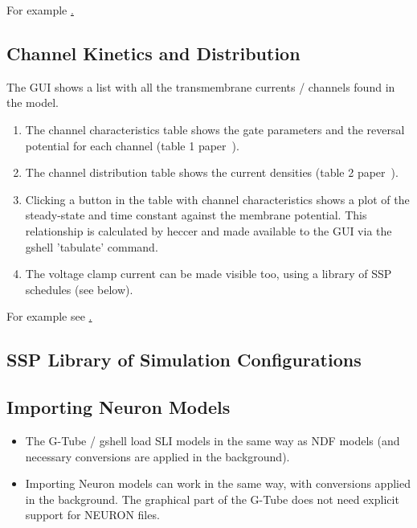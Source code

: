 \documentclass[12pt]{article}
\begin{document}
For example
\href{../pub-purkinje-deschutter-morphology/pub-purkinje-deschutter-morphology.tex}.

\subsection{Channel Kinetics and Distribution}

The GUI shows a list with all the transmembrane currents /
channels found in the model.
\begin{enumerate}
\item The channel characteristics table shows the gate parameters and
  the reversal potential for each channel (table 1
  paper~\cite{deschutter94:_purkin_i}).
\item The channel distribution table shows the current densities
  (table 2 paper~\cite{deschutter94:_purkin_i}).
\item Clicking a button in the table with channel characteristics
  shows a plot of the steady-state and time constant against the
  membrane potential.  This relationship is calculated by heccer and
  made available to the GUI via the gshell 'tabulate' command.
\item The voltage clamp current can be made visible too, using a
  library of SSP schedules (see below).
\end{enumerate}

For example see
\href{../pub-purkinje-deschutter-kinetics/pub-purkinje-deschutter-kinetics.tex}.


\subsection{SSP Library of Simulation Configurations}

\subsection{Importing Neuron Models}

\begin{itemize}
\item The G-Tube / gshell load SLI models in the same way as NDF
  models (and necessary conversions are applied in the background).
\item Importing Neuron models can work in the same way, with
  conversions applied in the background.  The graphical part of the
  G-Tube does not need explicit support for NEURON files.
\end{itemize}
\end{document}
